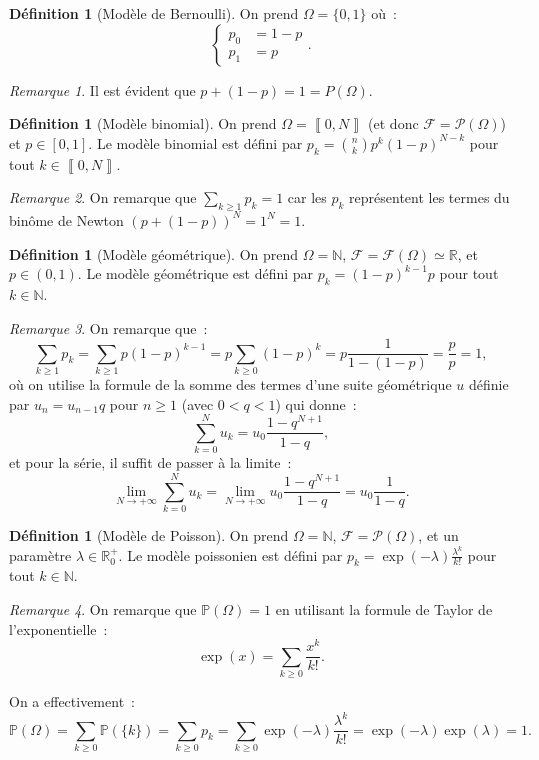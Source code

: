 \documentclass{article}
\newcommand{\N}{\mathbb N}
\renewcommand{\P}{\mathbb P}
\newcommand{\R}{\mathbb R}
\newcommand{\iintv}[2]{\left\llbracket#1, #2\right\rrbracket}
\theoremstyle{definition}
\newtheorem{déf}[thm]{Définition}
\theoremstyle{remark}
\newtheorem*{rmq}{Remarque}
\begin{document}
		\begin{déf}[Modèle de Bernoulli] On prend $\Omega = \{0, 1\}$ où~:
		\[\begin{cases}p_0 &= 1-p \\p_1 &= p\end{cases}.\] \end{déf}

		\begin{rmq} Il est évident que $p + (1-p) = 1 = P(\Omega)$. \end{rmq}

		\begin{déf}[Modèle binomial] On prend $\Omega = \iintv 0N$ (et donc $\mathcal F = \mathcal P(\Omega)$) et $p \in [0, 1]$.
		Le modèle binomial est défini par $p_k = \binom nkp^k(1-p)^{N-k}$ pour tout $k \in \iintv 0N$. \end{déf}

		\begin{rmq} On remarque que $\sum_{k \geq 1}p_k = 1$ car les $p_k$ représentent les termes du binôme de Newton $(p + (1-p))^N = 1^N = 1$. \end{rmq}

		\begin{déf}[Modèle géométrique] On prend $\Omega = \N$, $\mathcal F = \mathcal F(\Omega) \simeq \R$, et $p \in (0, 1)$. Le modèle géométrique
		est défini par $p_k = (1-p)^{k-1}p$ pour tout $k \in \N$. \end{déf}

		\begin{rmq} On remarque que~:
		\[\sum_{k \geq 1}p_k = \sum_{k \geq 1}p(1-p)^{k-1} = p\sum_{k \geq 0}(1-p)^k = p\frac 1{1-(1-p)} = \frac pp = 1,\]
		où on utilise la formule de la somme des termes d'une suite géométrique $u$ définie par $u_n = u_{n-1}q$ pour $n \geq 1$ (avec $0 < q < 1$) qui donne~:
		\[\sum_{k=0}^Nu_k = u_0\frac {1 - q^{N+1}}{1-q},\]
		et pour la série, il suffit de passer à la limite~:
		\[\lim_{N \to +\infty}\sum_{k=0}^Nu_k = \lim_{N \to +\infty}u_0\frac {1 - q^{N+1}}{1-q} = u_0\frac 1{1-q}.\]
		\end{rmq}

		\begin{déf}[Modèle de Poisson] On prend $\Omega  =\N$, $\mathcal F = \mathcal P(\Omega)$, et un paramètre $\lambda \in \R_0^+$.
		Le modèle poissonien est défini par $p_k = \exp(-\lambda)\frac {\lambda^k}{k!}$ pour tout $k \in \N$. \end{déf}

		\begin{rmq} On remarque que $\P(\Omega) = 1$ en utilisant la formule de Taylor de l'exponentielle~:
		\[\exp(x) = \sum_{k \geq 0}\frac {x^k}{k!}.\]

		On a effectivement~:
		\[\P(\Omega) = \sum_{k \geq 0}\P(\{k\}) = \sum_{k \geq 0}p_k = \sum_{k \geq 0}\exp(-\lambda)\frac {\lambda^k}{k!} = \exp(-\lambda)\exp(\lambda) = 1.\]
		\end{rmq}
\end{document}
